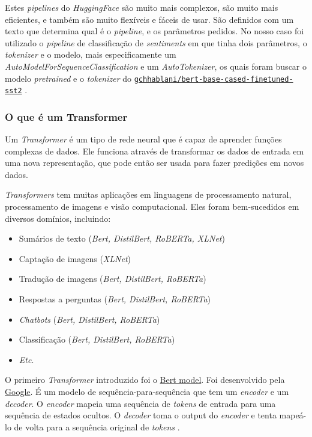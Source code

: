 Estes \textit{pipelines} do \textit{HuggingFace} são muito mais complexos, são muito mais eficientes, e também são muito flexíveis e fáceis de usar\cite{yt2}. São definidos com um texto que determina qual é o \textit{pipeline}, e os parâmetros pedidos. No nosso caso foi utilizado o \textit{pipeline} de classificação de \textit{sentiments} em que tinha dois parâmetros, o \textit{tokenizer} e o modelo, mais especificamente um \textit{AutoModelForSequenceClassification} e um \textit{AutoTokenizer}, os quais foram buscar o modelo \textit{pretrained} e o \textit{tokenizer} do \href{https://huggingface.co/gchhablani/bert-base-cased-finetuned-sst2}{\texttt{gchhablani/bert-base-cased-finetuned-sst2}} \cite{yt2}.

\subsubsection{O que é um Transformer}

Um \textit{Transformer} é um tipo de rede neural que é capaz de aprender funções complexas de dados. Ele funciona através de transformar os dados de entrada em uma nova representação, que pode então ser usada para fazer predições em novos dados.

\textit{Transformers} tem muitas aplicações em linguagens de processamento natural, processamento de imagens e visão computacional. Eles foram bem-sucedidos em diversos domínios, incluindo:

\begin{itemize}
    \item Sumários de texto (\textit{Bert, DistilBert, RoBERTa, XLNet})
    \item Captação de imagens (\textit{XLNet})
    \item Tradução de imagens (\textit{Bert, DistilBert, RoBERTa})
    \item Respostas a perguntas (\textit{Bert, DistilBert, RoBERTa})
    \item \textit{Chatbots} (\textit{Bert, DistilBert, RoBERTa})
    \item Classificação (\textit{Bert, DistilBert, RoBERTa})
    \item \textit{Etc}.
\end{itemize}

O primeiro \textit{Transformer} introduzido foi o \href{https://arxiv.org/abs/1810.04805}{Bert model}. Foi desenvolvido pela \href{https://www.google.com/}{Google}. É um modelo de sequência-para-sequência que tem um \textit{encoder} e um \textit{decoder}. O \textit{encoder} mapeia uma sequência de \textit{tokens} de entrada para uma sequência de estados ocultos. O \textit{decoder} toma o output do \textit{encoder} e tenta mapeá-lo de volta para a sequência original de \textit{tokens} \cite{yt2}.

